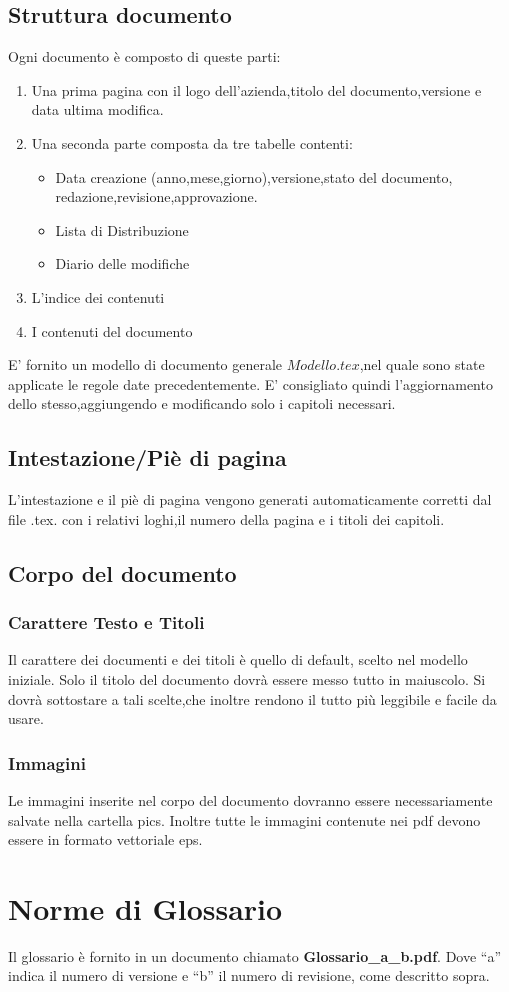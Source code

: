 \documentclass[11pt,titlepage,a4paper]{report}
\begin{document}
\subsection{Struttura documento}
Ogni documento \`e composto di queste parti:
\begin{enumerate}
\item Una prima pagina con il logo dell'azienda,titolo del documento,versione e data ultima modifica.
\item Una seconda parte composta da tre tabelle contenti:
	{\begin{itemize}
	\item Data creazione (anno,mese,giorno),versione,stato del documento,\\
			redazione,revisione,approvazione.
	\item Lista di Distribuzione
	\item Diario delle modifiche 
	\end{itemize}}
\item L'indice dei contenuti
\item I contenuti del documento

\end{enumerate}
E' fornito un modello di documento generale \( Modello.tex\),nel quale sono state
applicate le regole date precedentemente. E' consigliato quindi
l'aggiornamento dello stesso,aggiungendo e modificando solo i capitoli necessari.

\subsection{Intestazione/Pi\`e di pagina}
L'intestazione e il pi\`e di pagina vengono generati automaticamente corretti dal file .tex.
con i relativi loghi,il numero della pagina e i titoli dei capitoli.

\subsection{Corpo del documento}
	\subsubsection{Carattere Testo e Titoli}
	Il carattere dei documenti e dei titoli \`e quello di default, scelto nel modello iniziale. 
	Solo il titolo del documento dovr\`a essere messo tutto in maiuscolo.
	Si dovr\`a sottostare a tali scelte,che inoltre rendono il tutto pi\`u leggibile e facile da usare. 
	\subsubsection{Immagini}
	Le immagini inserite nel corpo del documento dovranno essere necessariamente salvate nella cartella pics. Inoltre tutte le immagini contenute nei pdf devono essere in formato vettoriale eps.
\section{Norme di Glossario}
	Il glossario \`e fornito in un documento chiamato \textbf{ Glossario\_a\_b.pdf}. 
	Dove ``a'' indica il numero di versione e ``b'' il numero di revisione, come descritto sopra.
\end{document}
